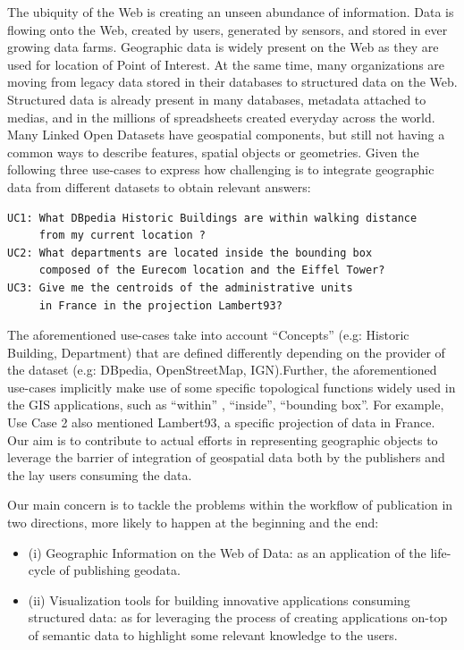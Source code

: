 The ubiquity of the Web is creating an unseen abundance of information. Data is flowing onto the Web, created by users, generated by sensors, and stored in ever growing data farms. Geographic data is widely present on the Web as they are used for location of Point of Interest. At the same time, many organizations are moving from legacy data stored in their databases to structured data on the Web. Structured data is already present in many databases, metadata attached to medias, and in the millions of spreadsheets created everyday across the world. 
Many Linked Open Datasets have geospatial components, but still not having a common ways to describe features, spatial objects or geometries. Given the following three use-cases to express how challenging is to integrate geographic data from different datasets to obtain relevant answers: 
\begin{verbatim}
UC1: What DBpedia Historic Buildings are within walking distance 
     from my current location ?
UC2: What departments are located inside the bounding box 
     composed of the Eurecom location and the Eiffel Tower? 
UC3: Give me the centroids of the administrative units 
     in France in the projection Lambert93?

\end{verbatim} 

 The aforementioned use-cases take into account ``Concepts'' (e.g: Historic Building, Department) that are defined differently depending on the provider of the dataset (e.g: DBpedia, OpenStreetMap, IGN).Further, the aforementioned use-cases implicitly make use of some specific topological functions widely used in the GIS applications, such as ``within'' , ``inside'', ``bounding box''. For example, Use Case 2 also mentioned Lambert93, a specific projection of data in France. Our aim is to contribute to actual efforts in representing geographic objects to leverage the barrier of integration of geospatial data both by the publishers and the lay users consuming the data. 

Our main concern is to tackle the problems within the workflow of publication in two directions, more likely to happen at the beginning and the end: 
\begin{itemize}
\item (i) Geographic Information on the Web of Data: as an application of the life-cycle of publishing geodata.
\item (ii) Visualization tools for building innovative applications consuming structured data: as for leveraging the process of creating applications on-top of semantic data to highlight some relevant knowledge to the users.

\end{itemize}

